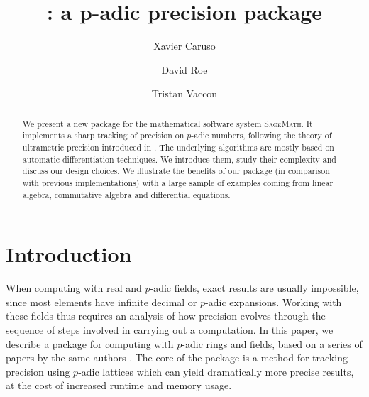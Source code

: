 \documentclass[sigconf]{acmart}
\newcommand{\sage}{\textsc{SageMath}\xspace}
\newcommand{\ZpL}{\text{\color{output} \rm \tt ZpL}\xspace}
\theoremstyle{definition}
\begin{document}
\title{\texorpdfstring{\ZpL}{ZpL}: a p-adic precision package}

\author{Xavier Caruso}
\author{David Roe}
\author{Tristan Vaccon}



\begin{abstract}
We present a new package \ZpL for the mathematical software system \sage. It 
implements a sharp tracking of precision on $p$-adic numbers, following 
the theory of ultrametric precision introduced in \cite{caruso-roe-vaccon:14a}. The 
underlying algorithms are mostly based on automatic differentiation 
techniques. We introduce them, study their complexity and discuss our 
design choices.
We illustrate the benefits of our package (in comparison with previous 
implementations) with a large sample of examples coming from linear 
algebra, commutative algebra and differential equations.
\end{abstract}

\maketitle

\section{Introduction}

When computing with real and $p$-adic fields, exact results are usually impossible,
since most elements have infinite decimal or $p$-adic expansions.
Working with these fields thus requires an analysis of how precision evolves
through the sequence of steps involved in carrying out a computation.
In this paper, we describe a package for computing with $p$-adic rings and fields,
based on a series of papers by the same authors
\cite{caruso-roe-vaccon:14a,caruso-roe-vaccon:15,caruso-roe-vaccon:16,caruso-roe-vaccon:17}.
The core of the package is a method for tracking precision using $p$-adic lattices which
can yield dramatically more precise results, at the cost of increased runtime and memory usage.
\end{document}
